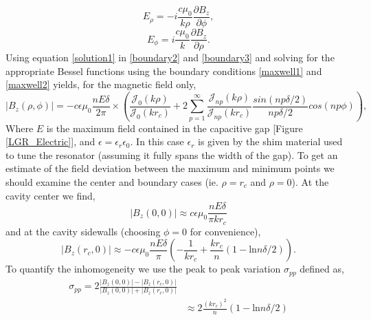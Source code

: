 \begin{equation}\label{boundary2}
E_{\rho} = -i\frac{c \mu_0}{k \rho}\frac{\partial B_z}{\partial \phi},
\end{equation}
\begin{equation}\label{boundary3}
E_{\phi} =  i \frac{ c \mu_0}{k}\frac{\partial B_z}{\partial \rho}.
\end{equation}
Using equation \ref{solution1} in \ref{boundary2} and \ref{boundary3} and solving for the appropriate Bessel functions using the boundary conditions \ref{maxwell1} and \ref{maxwell2} yields, for the magnetic field only,
\begin{equation}
|B_z(\rho,\phi)| = - c \epsilon\mu_0 \frac{n E \delta}{2\pi} \times \left(\frac{\mathcal{J}_0(k\rho)}{\mathcal{J}_0(k r_c)} + 2 \sum\limits_{p = 1}^{\infty} \frac{\mathcal{J}_{np}(k \rho)}{\mathcal{J}_{n p} (k r_c)} \frac{sin(np\delta/2)}{np\delta/2}cos(np\phi)\right),
\end{equation}
Where $E$ is the maximum field contained in the capacitive gap [Figure \ref{LGR_Electric}], and $\epsilon = \epsilon_r\epsilon_0$. In this case $\epsilon_r$ is given by the shim material used to tune the resonator (assuming it fully spans the width of the gap). To get an estimate of the field deviation between the maximum and minimum points we should examine the center and boundary cases (ie. $\rho = r_c$ and $\rho = 0$). At the cavity center we find,
\begin{equation} \label{fieldcenter}
|B_z(0,0)| \approx c \epsilon\mu_0 \frac{nE\delta}{\pi k r_c}
\end{equation}
and at the cavity sidewalls (choosing $\phi = 0$ for convenience),
\begin{equation}
|B_z(r_c,0)| \approx -c\epsilon\mu_0 \frac{nE \delta}{\pi} \left(-\frac{1}{k r_c}+ \frac{k r_c}{n}(1-\text{ln} n\delta/2)\right).
\end{equation}
To quantify the inhomogeneity we use the peak to peak variation $\sigma_{pp}$ defined as,
\begin{equation} \label{homogeneity}
\begin{split}
\sigma_{pp} = 2\frac{|B_z(0,0)| - |B_z(r_c,0)|}{|B_z(0,0)| + |B_z(r_c,0)|} \\
& \approx 2\frac{(kr_c)^2}{n}(1-\text{ln}n\delta/2)
\end{split}
\end{equation}
